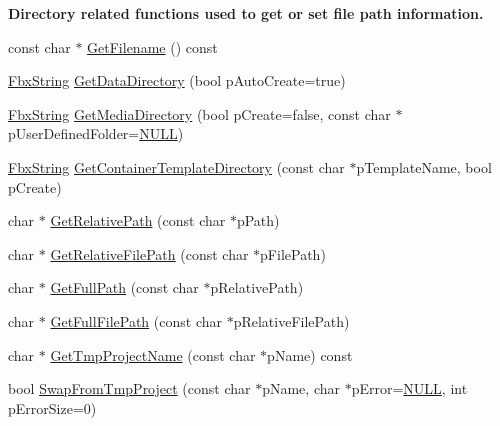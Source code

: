 \begin{Indent}\textbf{ Directory related functions used to get or set file path information.}\par
\begin{DoxyCompactItemize}
\item 
const char $\ast$ \hyperlink{class_fbx_i_o_a634cd1b2c4538395554b69843335dbf4}{Get\+Filename} () const
\item 
\hyperlink{class_fbx_string}{Fbx\+String} \hyperlink{class_fbx_i_o_a517013a57686934d9d18364f6f4fe3f5}{Get\+Data\+Directory} (bool p\+Auto\+Create=true)
\item 
\hyperlink{class_fbx_string}{Fbx\+String} \hyperlink{class_fbx_i_o_a484ddca5870fbd463e7cec6141993abc}{Get\+Media\+Directory} (bool p\+Create=false, const char $\ast$p\+User\+Defined\+Folder=\hyperlink{fbxarch_8h_a070d2ce7b6bb7e5c05602aa8c308d0c4}{N\+U\+LL})
\item 
\hyperlink{class_fbx_string}{Fbx\+String} \hyperlink{class_fbx_i_o_ac058c3d63519dc9b2b992d678c23a759}{Get\+Container\+Template\+Directory} (const char $\ast$p\+Template\+Name, bool p\+Create)
\item 
char $\ast$ \hyperlink{class_fbx_i_o_a2b7384d5acf077a30157e844ceaf307a}{Get\+Relative\+Path} (const char $\ast$p\+Path)
\item 
char $\ast$ \hyperlink{class_fbx_i_o_afc8ee80896d953653dc74d443c5ed427}{Get\+Relative\+File\+Path} (const char $\ast$p\+File\+Path)
\item 
char $\ast$ \hyperlink{class_fbx_i_o_aafb87b123c805ecab97d903b3b45decf}{Get\+Full\+Path} (const char $\ast$p\+Relative\+Path)
\item 
char $\ast$ \hyperlink{class_fbx_i_o_a368bd527e80f3b4d65d81c75da8bfd19}{Get\+Full\+File\+Path} (const char $\ast$p\+Relative\+File\+Path)
\item 
char $\ast$ \hyperlink{class_fbx_i_o_a1ee478c9c4f1f7e1c2e9b635a52f446a}{Get\+Tmp\+Project\+Name} (const char $\ast$p\+Name) const
\item 
bool \hyperlink{class_fbx_i_o_a6ae79670e3e61138a9f466dce97917c5}{Swap\+From\+Tmp\+Project} (const char $\ast$p\+Name, char $\ast$p\+Error=\hyperlink{fbxarch_8h_a070d2ce7b6bb7e5c05602aa8c308d0c4}{N\+U\+LL}, int p\+Error\+Size=0)
\end{DoxyCompactItemize}
\end{Indent}
